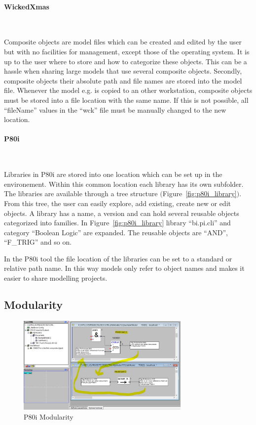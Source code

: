 \documentclass[a4paper,11pt,final]{article}
\begin{document}
\paragraph{WickedXmas}\

Composite objects are model files which can be created and edited by the user but
with no facilities for management, except those of the operating system.
It is up to the user where to store and how to categorize these objects.
This can be a hassle when sharing large models that use several composite objects.
Secondly, composite objects their absolute path and file names
are stored into the model file. Whenever the model e.g. is copied to an other workstation, 
composite objects must be stored into a file location with the same name.
If this is not possible, all ``fileName'' values in the ``wck'' file must be manually changed to the new location.

\paragraph{P80i}\

Libraries in P80i are stored into one location which can be set up in the environement.
Within this common location each library has its own subfolder.
The libraries are available through a tree structure $($Figure~\ref{fig:p80i_library}$)$.
From this tree, the user can easily explore, add existing, create new or edit objects.
A library has a name, a version and can hold several reusable objects categorized
into families. In Figure~\ref{fig:p80i_library} library ``bi.pi.cli'' and category
``Boolean Logic'' are expanded. The reusable objects are ``AND'', ``F\_TRIG'' and so on.

In the P80i tool the file location of the libraries can be set to a standard or relative path name.
In this way models only refer to object names and makes it easier to share modelling projects.

\subsection{Modularity}

\begin{figure}[here]
\center
\includegraphics[width=0.75\textwidth]{p80i_modularity.jpg}
\caption{P80i Modularity}
\label{fig:p80i_modularity}
\end{figure}
\end{document}
